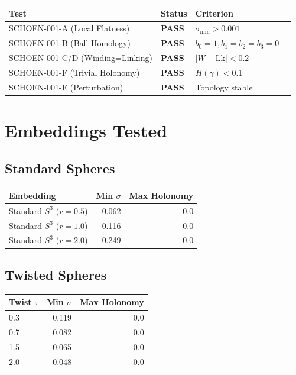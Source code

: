 \documentclass[12pt]{article}
\begin{document}
\begin{center}
\begin{tabular}{llll}
\toprule
\textbf{Test} & \textbf{Status} & \textbf{Criterion} \\
\midrule
SCHOEN-001-A (Local Flatness) & \textbf{PASS} & $\sigma_{\min} > 0.001$ \\
SCHOEN-001-B (Ball Homology) & \textbf{PASS} & $b_0=1, b_1=b_2=b_3=0$ \\
SCHOEN-001-C/D (Winding=Linking) & \textbf{PASS} & $|W - \text{Lk}| < 0.2$ \\
SCHOEN-001-F (Trivial Holonomy) & \textbf{PASS} & $H(\gamma) < 0.1$ \\
SCHOEN-001-E (Perturbation) & \textbf{PASS} & Topology stable \\
\bottomrule
\end{tabular}
\end{center}

\section{Embeddings Tested}

\subsection{Standard Spheres}

\begin{center}
\begin{tabular}{lrr}
\toprule
\textbf{Embedding} & \textbf{Min $\sigma$} & \textbf{Max Holonomy} \\
\midrule
Standard $S^3$ ($r=0.5$) & 0.062 & 0.0 \\
Standard $S^3$ ($r=1.0$) & 0.116 & 0.0 \\
Standard $S^3$ ($r=2.0$) & 0.249 & 0.0 \\
\bottomrule
\end{tabular}
\end{center}

\subsection{Twisted Spheres}

\begin{center}
\begin{tabular}{lrr}
\toprule
\textbf{Twist $\tau$} & \textbf{Min $\sigma$} & \textbf{Max Holonomy} \\
\midrule
0.3 & 0.119 & 0.0 \\
0.7 & 0.082 & 0.0 \\
1.5 & 0.065 & 0.0 \\
2.0 & 0.048 & 0.0 \\
\bottomrule
\end{tabular}
\end{center}
\end{document}
